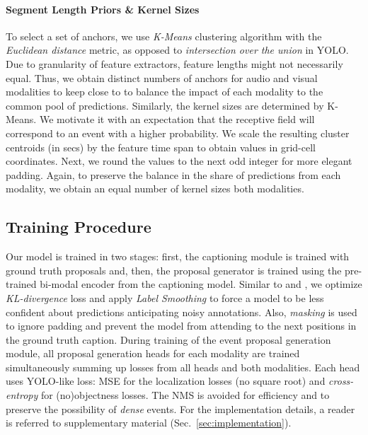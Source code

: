 \documentclass{src/bmvc2k}
\begin{document}
\vspace{-2ex}\paragraph{Segment Length Priors \& Kernel Sizes}
To select a set of anchors, we use \textit{K-Means} clustering algorithm with the \textit{Euclidean distance} metric, as opposed to \textit{intersection over the union} in YOLO. Due to granularity of feature extractors, feature lengths  might not necessarily equal. Thus, we obtain distinct numbers of anchors for audio and visual modalities  to keep  close to  to balance the impact of each modality to the common pool of predictions. Similarly, the kernel sizes are determined by K-Means. We motivate it with an expectation that the receptive field will correspond to an event with a higher probability. We scale the resulting cluster centroids (in secs) by the feature time span to obtain values in grid-cell coordinates. Next, we round the values to the next odd integer for more elegant padding. Again, to preserve the balance in the share of predictions from each modality, we obtain an equal number of kernel sizes  both modalities.\vspace{-1ex}

\subsection{Training Procedure\label{sec:train_proc}}

\vspace{-1ex}Our model is trained in two stages: first, the captioning module is trained with ground truth proposals and, then, the proposal generator is trained using the pre-trained bi-modal encoder from the captioning model. Similar to \cite{transformer_Vaswani2017} and \cite{mdvc_Iashin_2020}, we optimize \textit{KL-divergence} loss and apply \textit{Label Smoothing} \cite{Szegedy2016} to force a model to be less confident about predictions anticipating noisy annotations. Also, \textit{masking} is used to ignore padding and prevent the model from attending to the next positions in the ground truth caption. During training of the event proposal generation module, all proposal generation heads for each modality are trained simultaneously summing up losses from all heads and both modalities. Each head uses YOLO-like loss: MSE for the localization losses (no square root) and \textit{cross-entropy} for (no)objectness losses. The NMS is avoided for efficiency and to preserve the possibility of \textit{dense} events. For the implementation details, a reader is referred to supplementary material (Sec.~\ref{sec:implementation}).
\end{document}
